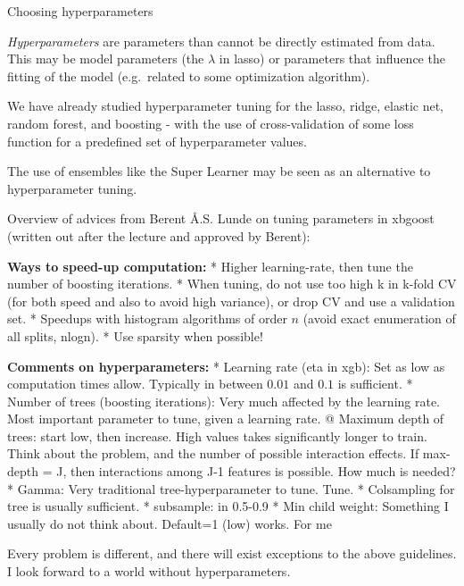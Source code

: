 \documentclass[
  ignorenonframetext,
]{beamer}
\begin{document}
\begin{frame}{Choosing hyperparameters}
\protect\hypertarget{choosing-hyperparameters}{}

\emph{Hyperparameters} are parameters than cannot be directly estimated
from data. This may be model parameters (the \(\lambda\) in lasso) or
parameters that influence the fitting of the model (e.g.~related to some
optimization algorithm).

We have already studied hyperparameter tuning for the lasso, ridge,
elastic net, random forest, and boosting - with the use of
cross-validation of some loss function for a predefined set of
hyperparameter values.

The use of ensembles like the Super Learner may be seen as an
alternative to hyperparameter tuning.

\end{frame}

\begin{frame}

Overview of advices from Berent Å.S. Lunde on tuning parameters in
xbgoost (written out after the lecture and approved by Berent):

\textbf{Ways to speed-up computation:} * Higher learning-rate, then tune
the number of boosting iterations. * When tuning, do not use too high k
in k-fold CV (for both speed and also to avoid high variance), or drop
CV and use a validation set. * Speedups with histogram algorithms of
order \(n\) (avoid exact enumeration of all splits, nlogn). * Use
sparsity when possible!

\end{frame}

\begin{frame}

\textbf{Comments on hyperparameters:} * Learning rate (eta in xgb): Set
as low as computation times allow. Typically in between \(0.01\) and
\(0.1\) is sufficient. * Number of trees (boosting iterations): Very
much affected by the learning rate. Most important parameter to tune,
given a learning rate. @ Maximum depth of trees: start low, then
increase. High values takes significantly longer to train. Think about
the problem, and the number of possible interaction effects. If
max-depth = J, then interactions among J-1 features is possible. How
much is needed? * Gamma: Very traditional tree-hyperparameter to tune.
Tune. * Colsampling for tree is usually sufficient. * subsample: in
0.5-0.9 * Min child weight: Something I usually do not think about.
Default=1 (low) works. For me

Every problem is different, and there will exist exceptions to the above
guidelines. I look forward to a world without hyperparameters.

\end{frame}
\end{document}

